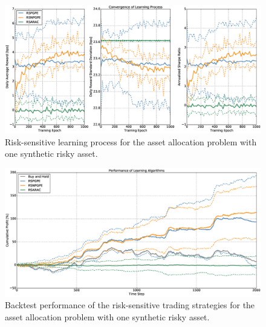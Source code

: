 \begin{figure}[t!]
	\centering
	\includegraphics[width=1.0\textwidth]{Images/6_4_single_synthetic_sensitive_convergence}
	\caption[Risk-sensitive learning process for one synthetic risky asset]{Risk-sensitive learning process for the asset allocation problem with one synthetic risky asset.}
	\label{fig:single_synthetic_sensitive_convergence}
\end{figure}

\begin{figure}[t!]
	\centering
	\includegraphics[width=1.0\textwidth]{Images/6_5_single_synthetic_sensitive_performance}
	\caption[Backtest performance with one synthetic risky asset]{Backtest performance of the risk-sensitive trading strategies for the asset allocation problem with one synthetic risky asset.}
	\label{fig:single_synthetic_sensitive_performance}
\end{figure}

